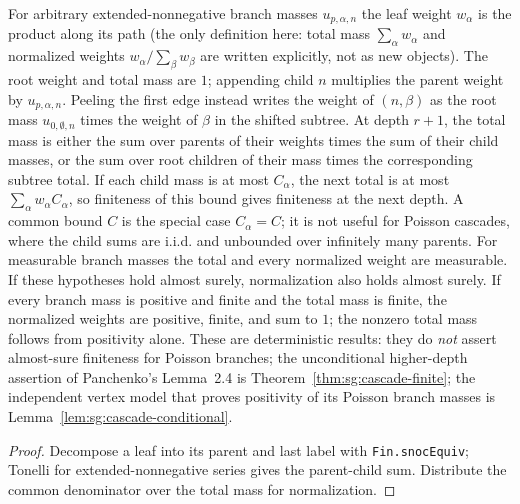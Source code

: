 \begin{lemma}\label{lem:sg:cascade-mass}
  \leanok
For arbitrary extended-nonnegative branch masses $u_{p,\alpha,n}$ the leaf
weight $w_\alpha$ is the product along its path (the only definition here:
total mass $\sum_\alpha w_\alpha$ and normalized weights
$w_\alpha/\sum_\beta w_\beta$ are written explicitly, not as new objects).
The root weight and total mass are $1$; appending child $n$ multiplies the parent
weight by $u_{p,\alpha,n}$. Peeling the first edge instead writes the weight of
$(n,\beta)$ as the root mass $u_{0,\emptyset,n}$ times the weight of $\beta$
in the shifted subtree. At depth $r+1$, the total mass is either the sum over
parents of their weights times the sum of their child masses, or the sum over
root children of their mass times the corresponding subtree total. If each child
mass is at most $C_\alpha$, the next total is at most
$\sum_\alpha w_\alpha C_\alpha$, so finiteness of this bound gives
finiteness at the next depth. A common bound $C$ is the special case
$C_\alpha=C$; it is not useful for Poisson cascades, where the child sums are
i.i.d. and unbounded over infinitely many parents. For measurable branch
masses the total and every normalized weight are
measurable. If these hypotheses hold almost surely, normalization also holds
almost surely. If every branch mass is positive and
finite and the total mass is finite, the normalized weights are positive,
finite, and sum to $1$; the nonzero
total mass follows from positivity alone. These are deterministic results: they do
\emph{not} assert almost-sure finiteness for Poisson
branches; the unconditional higher-depth assertion of Panchenko's Lemma~2.4
is Theorem~\ref{thm:sg:cascade-finite}; the independent vertex model that proves positivity of
its Poisson branch masses is Lemma~\ref{lem:sg:cascade-conditional}.
\end{lemma}
\begin{proof}
  \leanok
Decompose a leaf into its parent and last label with \texttt{Fin.snocEquiv};
Tonelli for extended-nonnegative series gives the parent-child sum.
Distribute the common denominator over the total mass for normalization.
\end{proof}

